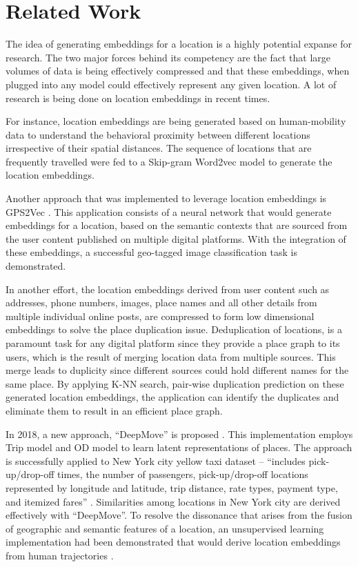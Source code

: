 \documentclass{article}
\begin{document}
\section{Related Work}
\par The idea of generating embeddings for a location is a highly potential expanse for research. The two major forces behind its competency are the fact that large volumes of data is being effectively compressed and that these embeddings, when plugged into any model could effectively represent any given location.  A lot of research is being done on location embeddings in recent times. 
\par For instance, location embeddings are being generated based on human-mobility data \parencite{GeoEmbeddings} to understand the behavioral proximity between different locations irrespective of their spatial distances. The sequence of locations that are frequently travelled were fed to a Skip-gram Word2vec model to generate the location embeddings. 
\par Another approach that was implemented to leverage location embeddings is GPS2Vec  \parencite{GPS2Vec}. This application consists of a neural network that would generate embeddings for a location, based on the semantic contexts that are sourced from the user content published on multiple digital platforms. With the integration of these embeddings, a successful geo-tagged image classification task is demonstrated. 
\par In another effort\parencite{PlaceDeduplication}, the location embeddings derived from user content such as addresses, phone numbers, images, place names and all other details from multiple individual online posts, are compressed to form low dimensional embeddings to solve the place duplication issue. Deduplication of locations, is a paramount task for any digital platform since they provide a place graph to its users, which is the result of merging location data from multiple sources. This merge leads to duplicity since different sources could hold different names for the same place. By applying K-NN search, pair-wise duplication prediction on these generated location embeddings, the application can identify the duplicates and eliminate them to result in an efficient place graph.
\par In 2018, a new approach, “DeepMove” is proposed \parencite{DeepMove}. This implementation employs Trip model and OD model to learn latent representations of places.  The approach is successfully applied to New York city yellow taxi dataset – “includes pick-up/drop-off times, the number of passengers, pick-up/drop-off locations represented by longitude and latitude, trip distance, rate types, payment type, and itemized fares” \parencite{DeepMove}. Similarities among locations in New York city are derived effectively with “DeepMove”. To resolve the dissonance that arises from the fusion of geographic and semantic features of a location, an unsupervised learning implementation had been demonstrated that would derive location embeddings from human trajectories \parencite{DisentangledLocationEmbeddings}. 
\end{document}
